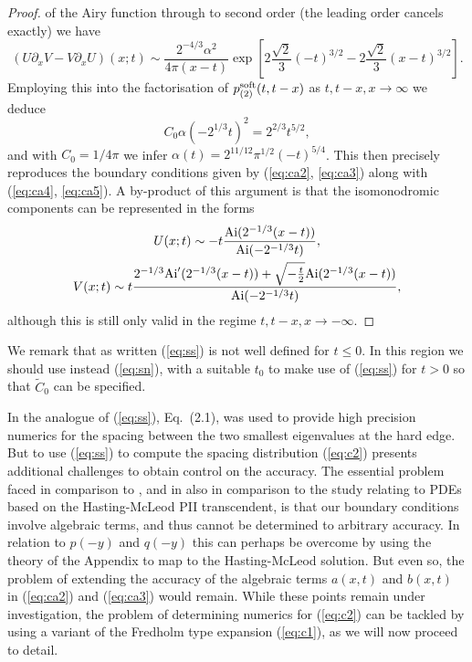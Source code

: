 \documentclass[10pt,reqno]{amsart}
\theoremstyle{plain}
\theoremstyle{definition}
\theoremstyle{remark}
\begin{document}
\begin{proof}
of the Airy function through to second order (the leading order cancels exactly) we have
\begin{equation}
  \left( U\partial_x V-V\partial_x U \right)(x;t) \sim \frac{2^{-4/3}\alpha^2}{4\pi(x-t)}
  \exp\left[ 2\frac{\sqrt{2}}{3}(-t)^{3/2}-2\frac{\sqrt{2}}{3}(x-t)^{3/2} \right] .
\end{equation} 
Employing this into the factorisation of $ p_{(2)}^{\rm soft}(t,t-x) $ as $ t, t-x, x \to \infty $ we
deduce
\begin{equation}
   C_{0}\alpha(-2^{1/3}t)^2 = 2^{2/3}t^{5/2} ,
\end{equation} 
and with $ C_{0}=1/4\pi $ we infer $ \alpha(t)=2^{11/12}\pi^{1/2}(-t)^{5/4} $. This then precisely
reproduces the boundary conditions given by (\ref{eq:ca2}, \ref{eq:ca3}) along with (\ref{eq:ca4}, \ref{eq:ca5}).
A by-product of this argument is that the isomonodromic components can be represented in the forms
\begin{gather}
  U(x;t) \sim -t\frac{{\rm Ai}(2^{-1/3}(x-t))}{{\rm Ai}(-2^{-1/3}t)} ,
\\
  V(x;t) \sim t\frac{2^{-1/3}{\rm Ai}'(2^{-1/3}(x-t))+\sqrt{-\frac{t}{2}}{\rm Ai}(2^{-1/3}(x-t))}{{\rm Ai}(-2^{-1/3}t)} ,
\end{gather}
although this is still only valid in the regime $ t, t-x, x \to -\infty $.
\end{proof}

We remark that as written (\ref{eq:ss}) is not well defined for $t \le 0$. In this region
we should use instead (\ref{eq:sn}), with a suitable $t_0$ to make use of (\ref{eq:ss}) for
$t > 0$ so that $\tilde{C}_0$ can be specified.

In \cite{FW_2007} the analogue of (\ref{eq:ss}), Eq.~(2.1), was used to provide high precision
numerics for the spacing between the two smallest eigenvalues at the hard edge.
But to use (\ref{eq:ss}) to compute the spacing distribution (\ref{eq:c2}) presents additional challenges
to obtain control on the accuracy. The essential problem faced in comparison to \cite{FW_2007},
and in also in comparison to the study \cite{PS_2004}
relating to PDEs based on the Hasting-McLeod PII transcendent, is that our
boundary conditions involve algebraic terms, and thus cannot be determined to
arbitrary accuracy. In relation to $p(-y)$ and $q(-y)$ this can perhaps be overcome by
using the theory of the Appendix to map to the Hasting-McLeod solution. But even so,
the problem of extending the accuracy of the algebraic terms $a(x,t)$ and $b(x,t)$ in
(\ref{eq:ca2}) and (\ref{eq:ca3}) would remain. While these points remain under investigation,
the problem of determining numerics for (\ref{eq:c2}) can be tackled by using a
variant of the Fredholm type expansion (\ref{eq:c1}), as we will now proceed to detail.
\end{document}

